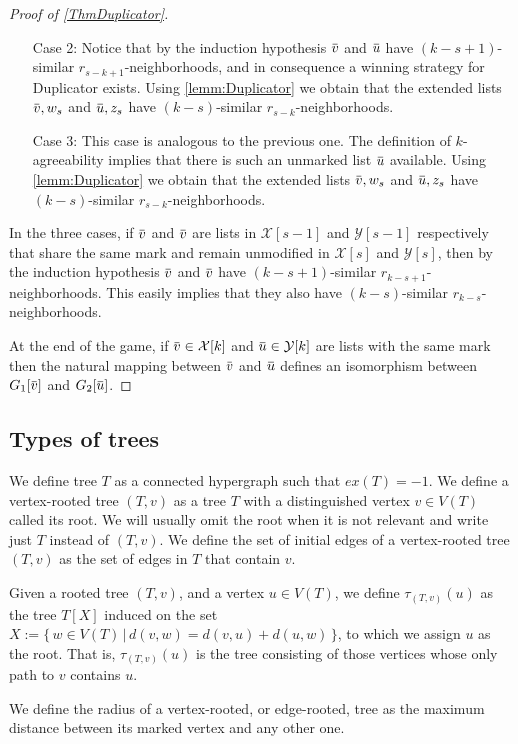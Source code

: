 \documentclass[12pt,notitlepage,a4paper]{article}
\theoremstyle{definition}
\newcommand{\overbar}[1]{\mkern 1.5mu\overline{\mkern-1.5mu#1\mkern-1.5mu}\mkern 1.5mu}
\begin{document}
\begin{proof}[Proof of \cref{ThmDuplicator}]
\begin{itemize}
		\item[Case 2:] Notice that by the induction hypothesis 
		$\overbar{v}$ and $\overbar{u}$ have $(k-s+1)$-similar
		$r_{s-k+1}$-neighborhoods, and in consequence a winning strategy
		for Duplicator exists. Using \cref{lemm:Duplicator} we obtain 
		that the extended lists $\overbar{v},w_s$ and $\overbar{u},z_s$
		have $(k-s)$-similar $r_{s-k}$-neighborhoods. 	
		
		\item[Case 3:] This case is analogous to the previous one.
		The definition of $k$-agreeability implies that there is 
		such an unmarked list $\overbar{u}$ available. Using \cref{lemm:Duplicator} 
		we obtain 
		that the extended lists $\overbar{v},w_s$ and $\overbar{u},z_s$
		have $(k-s)$-similar $r_{s-k}$-neighborhoods.	
	\end{itemize} 
	
	In the three cases, if $\overbar{v}$ and $\overbar{v}$
	are lists in $\mathcal{X}[s-1]$ and $\mathcal{Y}[s-1]$
	respectively that share the same mark and remain unmodified
	in $\mathcal{X}[s]$ and $\mathcal{Y}[s]$, then by the 
	induction hypothesis $\overbar{v}$ and $\overbar{v}$
	have $(k-s+1)$-similar $r_{k-s+1}$-neighborhoods. This
	easily implies that they also have
	$(k-s)$-similar $r_{k-s}$-neighborhoods.\par
	At the end of the game, if $\overbar{v}\in \mathcal{X}[k]$ and 
	$\overbar{u}\in \mathcal{Y}[k]$ are lists with the same mark
	then the natural mapping between $\overbar{v}$ and $\overbar{u}$
	defines an isomorphism between $G_1[\overbar{v}]$ and $G_2[\overbar{u}]$.
\end{proof}



\subsection{Types of trees}

We define tree $T$ as a connected hypergraph such that
$ex(T)=-1$. We define a vertex-rooted tree $(T,v)$ 
as a tree $T$ with a 
distinguished vertex $v\in V(T)$ called its root. We will
usually omit the root when it is not relevant and 
write just $T$ instead of $(T,v)$. We define the set
of initial edges of a vertex-rooted tree $(T,v)$ as the
set of edges in $T$ that contain $v$. \par
%
Given a rooted tree $(T, v)$, and a vertex $u\in V(T)$, 
we define $\tau_{(T,v)}(u)$ as the tree $T[X]$ induced on the
set $X:=\{ \, w\in V(T) \, | \, d(v,w)=d(v,u)+ d(u,w) \,  \}
$, to which we assign $u$ as the root.
That is, $\tau_{(T,v)}(u)$ is the tree consisting of those vertices
whose only path to $v$ contains $u$.
\par
We define the radius of a vertex-rooted, or edge-rooted,
tree as the maximum distance between its marked
vertex and any other one. \par
\end{document}

